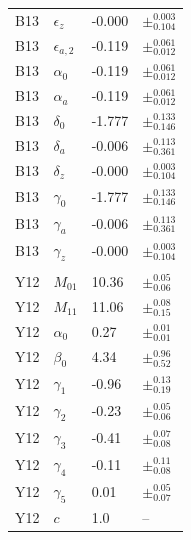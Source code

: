 \documentclass[useAMS,fleqn,usenatbib]{mnras}
\begin{document}
\begin{table}
\begin{tabular}{ |p{1.5cm}|p{1.6cm}|p{1.2cm}|p{2cm}}
B13		& $\epsilon_{z}$ 	&  -0.000		& $\pm^{0.003}_{0.104}$ 	\\%
B13		& $\epsilon_{a,2}$ 	&  -0.119		& $\pm^{0.061}_{0.012}$ 	\\%
B13		& $\alpha_{0}$ 		&  -0.119		& $\pm^{0.061}_{0.012}$ 	\\%
B13		& $\alpha_{a}$ 		&  -0.119		& $\pm^{0.061}_{0.012}$ 	\\%
B13		& $\delta_{0}$ 		&  -1.777		& $\pm^{0.133}_{0.146}$ 	\\%
B13		& $\delta_{a}$ 		&  -0.006		& $\pm^{0.113 }_{0.361}$ 	\\%
B13		& $\delta_{z}$ 		&  -0.000		& $\pm^{0.003}_{0.104}$ 	\\%
B13		& $\gamma_{0}$ 	&  -1.777		& $\pm^{0.133}_{0.146}$ 	\\%
B13		& $\gamma_{a}$ 	&  -0.006		& $\pm^{0.113 }_{0.361}$ 	\\%
B13		& $\gamma_{z}$ 	&  -0.000		& $\pm^{0.003}_{0.104}$ 	\\%
\\
Y12		& $M_{01}$ 		&  10.36		& $\pm^{0.05}_{0.06}$	\\%
Y12		& $M_{11}$ 		&  11.06		& $\pm^{0.08}_{0.15}$	\\%
Y12		& $\alpha_{0}$ 		&  0.27 		& $\pm^{0.01}_{0.01}$	\\%
Y12		& $\beta_{0}$ 		&  4.34		& $\pm^{0.96}_{0.52}$	\\%
Y12		& $\gamma_{1}$ 	&  -0.96		& $\pm^{0.13}_{0.19}$ 	\\%
Y12		& $\gamma_{2}$ 	&  -0.23		& $\pm^{0.05 }_{0.06}$ 	\\%
Y12		& $\gamma_{3}$ 	&  -0.41		& $\pm^{0.07}_{0.08}$ 	\\%
Y12		& $\gamma_{4}$ 	&  -0.11		& $\pm^{0.11}_{0.08}$ 	\\%
Y12		& $\gamma_{5}$ 	&  0.01		& $\pm^{0.05 }_{0.07}$ 	\\%
Y12		& $c$ 			&  1.0		& -- 					\\%

\hline
\end{tabular}
\end{table}
\end{document}
